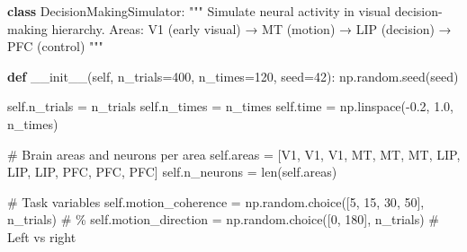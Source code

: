 \documentclass[
  11pt,
  letterpaper,
  oneside,
  openany]{book}
\newenvironment{Shaded}{\begin{snugshade}}{\end{snugshade}}
\newcommand{\BuiltInTok}[1]{\textcolor[rgb]{0.00,0.23,0.31}{#1}}
\newcommand{\CommentTok}[1]{\textcolor[rgb]{0.37,0.37,0.37}{#1}}
\newcommand{\DecValTok}[1]{\textcolor[rgb]{0.68,0.00,0.00}{#1}}
\newcommand{\FloatTok}[1]{\textcolor[rgb]{0.68,0.00,0.00}{#1}}
\newcommand{\FunctionTok}[1]{\textcolor[rgb]{0.28,0.35,0.67}{#1}}
\newcommand{\KeywordTok}[1]{\textcolor[rgb]{0.00,0.23,0.31}{\textbf{#1}}}
\newcommand{\NormalTok}[1]{\textcolor[rgb]{0.00,0.23,0.31}{#1}}
\newcommand{\OperatorTok}[1]{\textcolor[rgb]{0.37,0.37,0.37}{#1}}
\newcommand{\StringTok}[1]{\textcolor[rgb]{0.13,0.47,0.30}{#1}}
\newcommand{\VariableTok}[1]{\textcolor[rgb]{0.07,0.07,0.07}{#1}}
\begin{document}
\begin{Shaded}
\begin{Highlighting}[]
\KeywordTok{class}\NormalTok{ DecisionMakingSimulator:}
    \CommentTok{"""}
\CommentTok{    Simulate neural activity in visual decision{-}making hierarchy.}
\CommentTok{    }
\CommentTok{    Areas: V1 (early visual) → MT (motion) → LIP (decision) → PFC (control)}
\CommentTok{    """}
    
    \KeywordTok{def} \FunctionTok{\_\_init\_\_}\NormalTok{(}\VariableTok{self}\NormalTok{, n\_trials}\OperatorTok{=}\DecValTok{400}\NormalTok{, n\_times}\OperatorTok{=}\DecValTok{120}\NormalTok{, seed}\OperatorTok{=}\DecValTok{42}\NormalTok{):}
\NormalTok{        np.random.seed(seed)}
        
        \VariableTok{self}\NormalTok{.n\_trials }\OperatorTok{=}\NormalTok{ n\_trials}
        \VariableTok{self}\NormalTok{.n\_times }\OperatorTok{=}\NormalTok{ n\_times}
        \VariableTok{self}\NormalTok{.time }\OperatorTok{=}\NormalTok{ np.linspace(}\OperatorTok{{-}}\FloatTok{0.2}\NormalTok{, }\FloatTok{1.0}\NormalTok{, n\_times)}
        
        \CommentTok{\# Brain areas and neurons per area}
        \VariableTok{self}\NormalTok{.areas }\OperatorTok{=}\NormalTok{ [}\StringTok{\textquotesingle{}V1\textquotesingle{}}\NormalTok{, }\StringTok{\textquotesingle{}V1\textquotesingle{}}\NormalTok{, }\StringTok{\textquotesingle{}V1\textquotesingle{}}\NormalTok{, }\StringTok{\textquotesingle{}MT\textquotesingle{}}\NormalTok{, }\StringTok{\textquotesingle{}MT\textquotesingle{}}\NormalTok{, }\StringTok{\textquotesingle{}MT\textquotesingle{}}\NormalTok{, }
                     \StringTok{\textquotesingle{}LIP\textquotesingle{}}\NormalTok{, }\StringTok{\textquotesingle{}LIP\textquotesingle{}}\NormalTok{, }\StringTok{\textquotesingle{}LIP\textquotesingle{}}\NormalTok{, }\StringTok{\textquotesingle{}PFC\textquotesingle{}}\NormalTok{, }\StringTok{\textquotesingle{}PFC\textquotesingle{}}\NormalTok{, }\StringTok{\textquotesingle{}PFC\textquotesingle{}}\NormalTok{]}
        \VariableTok{self}\NormalTok{.n\_neurons }\OperatorTok{=} \BuiltInTok{len}\NormalTok{(}\VariableTok{self}\NormalTok{.areas)}
        
        \CommentTok{\# Task variables}
        \VariableTok{self}\NormalTok{.motion\_coherence }\OperatorTok{=}\NormalTok{ np.random.choice([}\DecValTok{5}\NormalTok{, }\DecValTok{15}\NormalTok{, }\DecValTok{30}\NormalTok{, }\DecValTok{50}\NormalTok{], n\_trials)  }\CommentTok{\# \%}
        \VariableTok{self}\NormalTok{.motion\_direction }\OperatorTok{=}\NormalTok{ np.random.choice([}\DecValTok{0}\NormalTok{, }\DecValTok{180}\NormalTok{], n\_trials)  }\CommentTok{\# Left vs right}
        

\end{Highlighting}
\end{Shaded}
\end{document}
